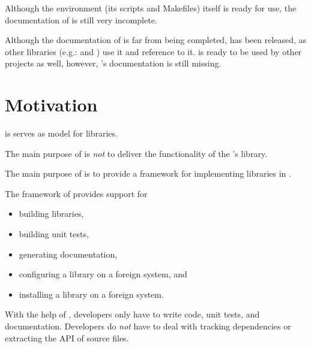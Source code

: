 %                                                                        
%                                                                        
%                                                                        
%                                                                        
%
\pagebreak
{\huge Although the \projectname environment (its scripts and  Makefiles) itself is ready for use, the documentation of \projectname is still very incomplete.}

Although the documentation of \projectname is far from being completed, \projectname has been released, as other libraries (e.g.: \LibAldorUnit\cite{AldorUnit} and \LibExtIO\cite{ExtIO}) use it and reference to it. \projectname is ready to be used by other \Aldor projects as well, however, \projectname's documentation is still missing.
\pagebreak
\section{Motivation}


\projectname is serves as model for \Aldor libraries.

The main purpose of \projectname is {\it not} to deliver the functionality of the \projectname's library.

The main purpose of \projectname is to provide a framework for implementing libraries in \Aldor.

The framework of \projectname provides support for
\begin{itemize}
\item building libraries,
\item building unit tests,
\item generating documentation,
\item configuring a library on a foreign system, and
\item installing a library on a foreign system.
\end{itemize}

With the help of \LibModel, developers only have to write code, unit tests, and documentation. Developers do {\it not} have to deal with tracking dependencies or extracting the API of source files.
